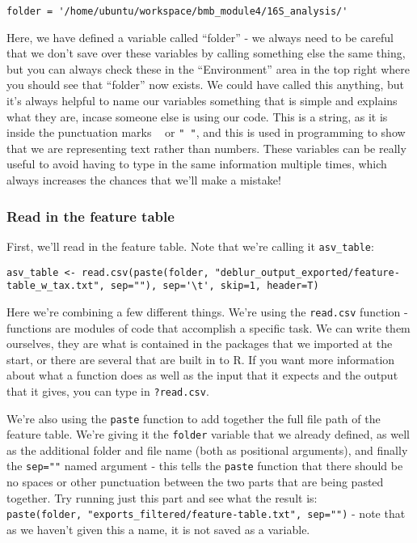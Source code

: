 \documentclass[
]{book}
\begin{document}
\begin{verbatim}
folder = '/home/ubuntu/workspace/bmb_module4/16S_analysis/'
\end{verbatim}

Here, we have defined a variable called ``folder'' - we always need to be careful that we don't save over these variables by calling something else the same thing, but you can always check these in the ``Environment'' area in the top right where you should see that ``folder'' now exists. We could have called this anything, but it's always helpful to name our variables something that is simple and explains what they are, incase someone else is using our code. This is a string, as it is inside the punctuation marks \texttt{\textquotesingle{}\ \textquotesingle{}} or \texttt{"\ "}, and this is used in programming to show that we are representing text rather than numbers. These variables can be really useful to avoid having to type in the same information multiple times, which always increases the chances that we'll make a mistake!

\subsubsection{Read in the feature table}\label{read-in-the-feature-table-1}

First, we'll read in the feature table. Note that we're calling it \texttt{asv\_table}:

\begin{verbatim}
asv_table <- read.csv(paste(folder, "deblur_output_exported/feature-table_w_tax.txt", sep=""), sep='\t', skip=1, header=T)
\end{verbatim}

Here we're combining a few different things. We're using the \texttt{read.csv} function - functions are modules of code that accomplish a specific task. We can write them ourselves, they are what is contained in the packages that we imported at the start, or there are several that are built in to R. If you want more information about what a function does as well as the input that it expects and the output that it gives, you can type in \texttt{?read.csv}.

We're also using the \texttt{paste} function to add together the full file path of the feature table. We're giving it the \texttt{folder} variable that we already defined, as well as the additional folder and file name (both as positional arguments), and finally the \texttt{sep=""} named argument - this tells the \texttt{paste} function that there should be no spaces or other punctuation between the two parts that are being pasted together. Try running just this part and see what the result is: \texttt{paste(folder,\ "exports\_filtered/feature-table.txt",\ sep="")} - note that as we haven't given this a name, it is not saved as a variable.
\end{document}
